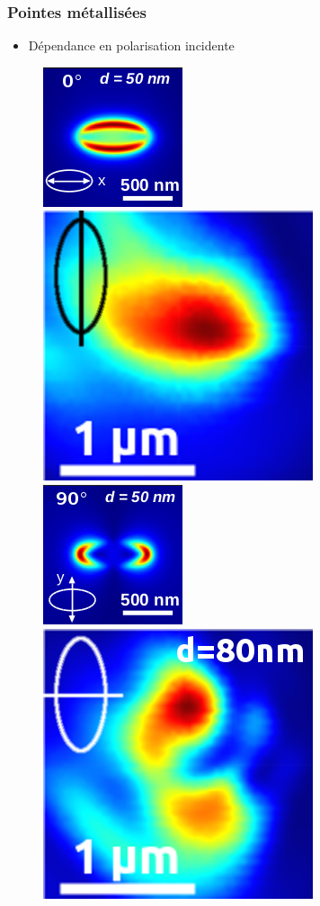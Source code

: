 \documentclass[9pt,a9paper,handout]{beamer}
\begin{document}
    \begin{frame}    
        \frametitle{Pointes métallisées}

        \begin{itemize} \item Dépendance en polarisation incidente
        \end{itemize}
        \vspace*{0mm}
        \vspace*{0mm}
        \begin{figure}[c]\centering
            \includegraphics[height=0.15\textwidth]{Images/Scans/theorie_polar_long}
            \quad
            \includegraphics[height=0.15\textwidth]{Images/Scans/polar_long}
            \qquad\qquad
            \includegraphics[height=0.15\textwidth]{Images/Scans/theorie_polar_trans}
            \quad
            \includegraphics[height=0.15\textwidth]{Images/Scans/polar_trans}
        \end{figure}


\end{frame}
\end{document}
